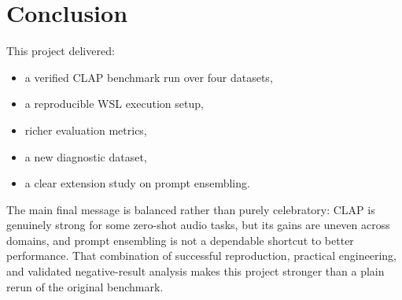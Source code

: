 \documentclass[11pt]{article}
\begin{document}
\section{Conclusion}

This project delivered:
\begin{itemize}[leftmargin=1.25em]
  \item a verified CLAP benchmark run over four datasets,
  \item a reproducible WSL execution setup,
  \item richer evaluation metrics,
  \item a new diagnostic dataset,
  \item a clear extension study on prompt ensembling.
\end{itemize}

The main final message is balanced rather than purely celebratory: CLAP is
genuinely strong for some zero-shot audio tasks, but its gains are uneven
across domains, and prompt ensembling is not a dependable shortcut to better
performance. That combination of successful reproduction, practical
engineering, and validated negative-result analysis makes this project stronger
than a plain rerun of the original benchmark.
\end{document}
